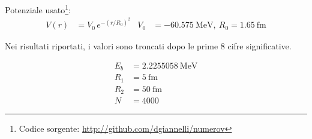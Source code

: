 \documentclass[12pt,a4paper]{article}
\begin{document}
Potenziale usato\footnote{Codice sorgente: \url{http://github.com/dgiannelli/numerov}}:
\begin{align*}
    V(r) &= V_0\,e^{-\left(r/R_0\right)^2} & V_0 &=-60.575\ \mathrm{MeV},\ R_0 = 1.65\ \mathrm{fm}
\end{align*}

Nei risultati riportati, i valori sono troncati dopo le prime 8 cifre significative.\\

\vspace{2em}

\begin{figure}[htb]
    \centering
    \begin{subfigure}{.65\textwidth}
        \centering
    \end{subfigure}%
    \begin{subfigure}{.35\textwidth}
        \centering
        \begin{align*}
            E_b &=2.2255058\ \mathrm{MeV}\\
            R_1 &=5\ \mathrm{fm}\\
            R_2 &=50\ \mathrm{fm}\\
            N &=4000
        \end{align*}
    \end{subfigure}
\end{figure}

\vspace{2em}
\end{document}
